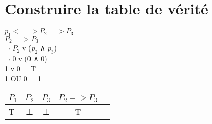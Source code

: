 \section{Construire la table de vérité}
\vspace{5mm} %
$p_1 <=> P_2 => P_3$ \\

$P_2 => P_3$ \\
¬ $P_2$ v ($p_2$ ∧ $p_3$) \\
¬ 0 v (0 ∧ 0) \\
1 v 0 = T \\
1 OU 0 = 1 \\

\begin{tabular}{|l|c|c|c|c|}
  \hline
  $P_1$ & $P_2$ & $P_3$ & $P_2 => P_3$ \\
  \hline
  T & ⊥ & ⊥ & T \\
  \hline
\end{tabular}
